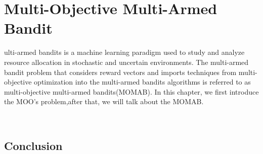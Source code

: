 %
%
\let\textcircled=\pgftextcircled
\chapter{Multi-Objective Multi-Armed Bandit}
\label{chap:momab}

ulti-armed bandits is a machine learning paradigm used to study and analyze resource allocation in stochastic and uncertain environments. The multi-armed bandit problem that considers reward vectors and imports techniques from multi-objective optimization into the multi-armed bandits algorithms is referred to as multi-objective multi-armed bandits(MOMAB). In this chapter, we first introduce the MOO's problem,after that, we will talk about the MOMAB.

\
\
\
\
\
\







\section{Conclusion}